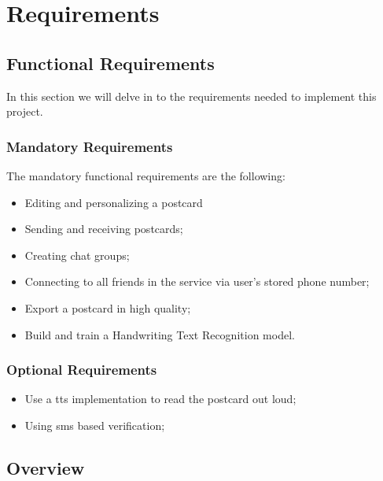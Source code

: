 \chapter{Requirements}
\label{ch:Chapter3}
\vfill \minitoc \newpage

\section{Functional Requirements}
In this section we will delve in to the requirements needed to implement this project. %


\subsection{Mandatory Requirements}

The mandatory functional requirements are the following:
\begin{itemize}
    \item Editing and personalizing a postcard

	\item Sending and receiving postcards;
	
	\item Creating chat groups;
	
	\item Connecting to all friends in the service via user's stored phone number;
	
	\item Export a postcard in high quality;

    \item Build and train a Handwriting Text Recognition model.
\end{itemize}


\subsection{Optional Requirements}

\begin{itemize}
        \item Use a \gls{tts} implementation to read the postcard out loud;
        \item Using \gls{sms} based verification;
\end{itemize}

\bigskip 

\section{Overview}
\noindent

